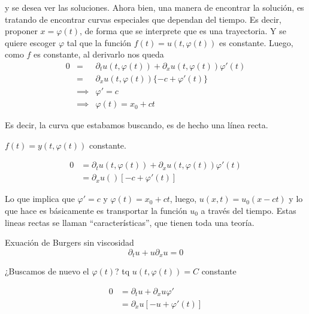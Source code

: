 y se desea ver las soluciones. Ahora bien, una manera de encontrar la solución, es tratando de encontrar curvas especiales que dependan del tiempo. Es decir, proponer $x = \varphi(t)$, de forma que se interprete que es una trayectoria. Y se quiere escoger $\varphi$ tal que la función $f(t) = u(t, \varphi(t))$ es constante. Luego, como $f$ es constante, al derivarlo nos queda
\begin{eqnarray}
    0 
    &=& \partial_t u(t, \varphi(t)) + \partial_x u(t, \varphi(t)) \varphi'(t) \\
    &=& \partial_x u(t, \varphi(t)) \{ -c + \varphi'(t) \} \\
    &\implies& \varphi' = c\\
    &\implies& \varphi(t) = x_0 + ct
\end{eqnarray}

Es decir, la curva que estabamos buscando, es de hecho una línea recta.



$f(t) = y(t, \varphi(t))$ constante. 

\begin{eqnarray}
    0 
    &= \partial_t u(t, \varphi(t)) + \partial_x u(t, \varphi(t)) \varphi' (t)\\
    &= \partial_x u() [- c + \varphi'(t)]
\end{eqnarray} 

Lo que implica que $\varphi' = c$ y $\varphi(t) = x_0 + ct$, luego, $u(x, t) = u_0(x - ct)$ y lo que hace es básicamente es transportar la función $u_0$ a través del tiempo. Estas lineas rectas se llaman ``características'', que tienen toda una teoría.

Exuación de Burgers sin viscosidad 
\begin{equation}
    \partial_t u + u \partial_x u = 0
\end{equation}

¿Buscamos de nuevo el $\varphi(t)$? tq $u(t, \varphi(t)) = C$ constante

\begin{eqnarray}
    0 
    &= \partial_t u + \partial_x u \varphi'\\
    & = \partial_x u [-u + \varphi'(t)]
\end{eqnarray}



